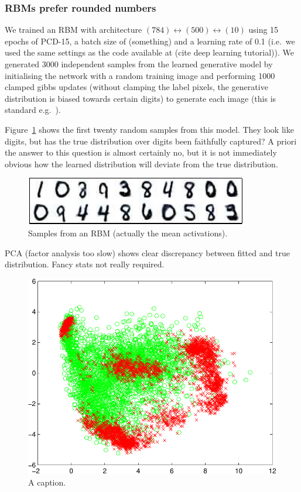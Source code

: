 \documentclass{article}
\def\ie{i.e.\ }
\def\eg{e.g.\ }
\begin{document}
\subsubsection{RBMs prefer rounded numbers}

We trained an RBM with architecture $(784)\leftrightarrow(500)\leftrightarrow(10)$ using 15 epochs of PCD-15, a batch size of (something) and a learning rate of 0.1 (\ie we used the same settings as the code available at (cite deep learning tutorial)).
We generated 3000 independent samples from the learned generative model by initialising the network with a random training image and performing 1000 clamped gibbs updates (without clamping the label pixels, the generative distribution is biased towards certain digits) to generate each image (this is standard \eg \cite{Hinton2007}).

Figure~\ref{fig:rbm_samples} shows the first twenty random samples from this model.
They look like digits, but has the true distribution over digits been faithfully captured?
A priori the answer to this question is almost certainly no, but it is not immediately obvious how the learned distribution will deviate from the true distribution.

\begin{figure}[ht]
\centering
\includegraphics[width=0.98\columnwidth]{figures/rbm_samples}
\caption{
Samples from an RBM (actually the mean activations).
}
\label{fig:rbm_samples}
\end{figure}

PCA (factor analysis too slow) shows clear discrepancy between fitted and true distribution.
Fancy stats not really required.

\begin{figure}[ht]
\centering
\includegraphics[width=0.98\columnwidth]{figures/rbm_pca}
\caption{
A caption.
}
\label{fig:rbm_pca}
\end{figure}
\end{document}
